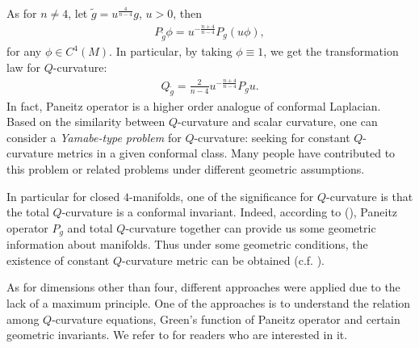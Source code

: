 \documentclass[12pt]{amsart}
\theoremstyle{definition}
\theoremstyle{remark}
\numberwithin{equation}{section}
\begin{document}
As for $n\neq 4$, let $\tilde{g} = u^{\frac{4}{n-4}}g$, $u > 0$, then
\begin{align}
P_{\tilde{g}} \phi = u^{-\frac{n+4}{n-4}}P_g (u \phi),
\end{align}
for any $\phi \in C^4 (M)$. In particular, by taking $\phi \equiv 1$, we get the transformation law for $Q$-curvature:
\begin{align}\label{eqn:conf_Q_n}
Q_{\tilde{g}} = \frac{2}{n-4}u^{-\frac{n+4}{n-4}}P_g u.
\end{align}
In fact, Paneitz operator is a higher order analogue of conformal Laplacian.\\

Based on the similarity between $Q$-curvature and scalar curvature, one can consider a \emph{Yamabe-type problem} for $Q$-curvature: seeking for constant $Q$-curvature metrics in a given conformal class. Many people have contributed to this problem or related problems under different geometric assumptions.

In particular for closed $4$-manifolds, one of the significance for $Q$-curvature is that the total $Q$-curvature is a conformal invariant. Indeed, according to (\cite{Gur98, Gur99}), Paneitz operator $P_{g}$ and total $Q$-curvature together can provide us some geometric information about manifolds. Thus under some geometric conditions, the existence of constant $Q$-curvature metric can be obtained (c.f. \cite{CY95, DM08, LLL12}). 

As for dimensions other than four, different approaches were applied due to the lack of a maximum principle. One of the approaches is to understand the relation among $Q$-curvature equations, Green's function of Paneitz operator and certain geometric invariants. We refer to \cite{QR06, Lin15, GM14, HY14a, HY14b, GHL15} for readers who are interested in it.
\end{document}
